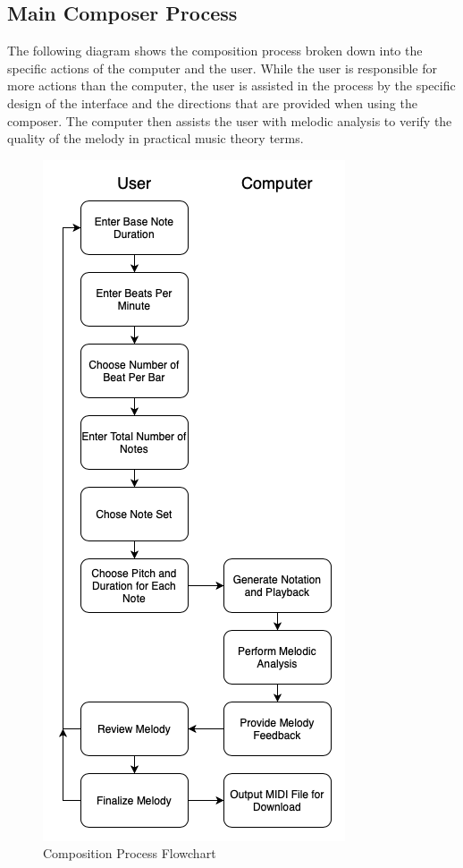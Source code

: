 \subsection{Main Composer Process}
\label{subsec:maincomposerprocess}

The following diagram shows the composition process broken down into the specific actions of the computer and the user.  While the user is responsible for more actions than the computer, the user is assisted in the process by the specific design of the interface and the directions that are provided when using the composer.  The computer then assists the user with melodic analysis to verify the quality of the melody in practical music theory terms.

\begin{figure}[!htbp]
	\centering
	\caption{Composition Process Flowchart}
	\includegraphics[scale=0.66]{images/composerProcess.png}
\end{figure}

